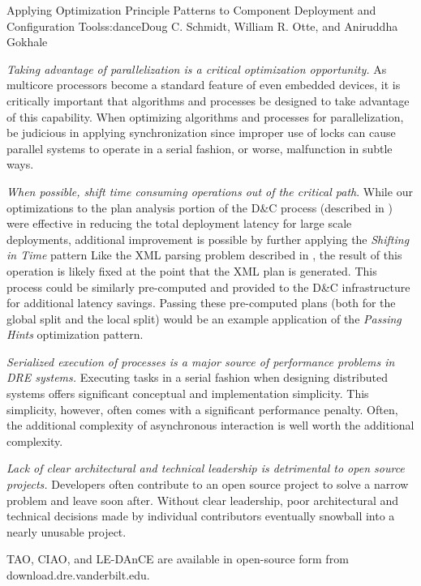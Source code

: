\begin{aosachapter}{Applying Optimization Principle Patterns to Component Deployment and
                    Configuration Tools}{s:dance}{Doug C. Schmidt, William R. Otte, and Aniruddha Gokhale}
\begin{aosaitemize}
\item
  \emph{Taking advantage of parallelization is a critical optimization
  opportunity.} As multicore processors become a standard feature of
  even embedded devices, it is critically important that algorithms and
  processes be designed to take advantage of this capability. When
  optimizing algorithms and processes for parallelization, be judicious
  in applying synchronization since improper use of locks can cause
  parallel systems to operate in a serial fashion, or worse, malfunction
  in subtle ways.
\item
  \emph{When possible, shift time consuming operations out of the
  critical path}. While our optimizations to the plan analysis portion
  of the D\&C process (described in ) were
  effective in reducing the total deployment latency for large scale
  deployments, additional improvement is possible by further applying
  the \emph{Shifting in Time} pattern Like the XML parsing problem
  described in , the result of this
  operation is likely fixed at the point that the XML plan is generated.
  This process could be similarly pre-computed and provided to the D\&C
  infrastructure for additional latency savings. Passing these
  pre-computed plans (both for the global split and the local split)
  would be an example application of the \emph{Passing Hints}
  optimization pattern.
\item
  \emph{Serialized execution of processes is a major source of
  performance problems in DRE systems.} Executing tasks in a serial
  fashion when designing distributed systems offers significant
  conceptual and implementation simplicity. This simplicity, however,
  often comes with a significant performance penalty. Often, the
  additional complexity of asynchronous interaction is well worth the
  additional complexity.
\item
  \emph{Lack of clear architectural and technical leadership is
  detrimental to open source projects.} Developers often contribute to
  an open source project to solve a narrow problem and leave soon after.
  Without clear leadership, poor architectural and technical decisions
  made by individual contributors eventually snowball into a nearly
  unusable project.
\end{aosaitemize}

TAO, CIAO, and LE-DAnCE are available in open-source form from
download.dre.vanderbilt.edu.

\end{aosachapter}
